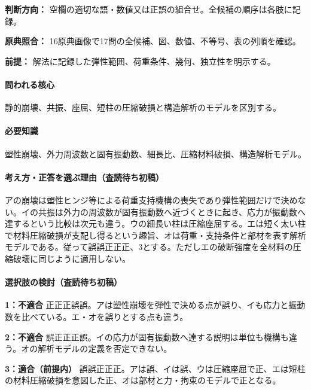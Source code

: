 \noindent\textbf{判断方向：} 空欄の適切な語・数値又は正誤の組合せ。全候補の順序は各肢に記録。\par

\noindent\textbf{原典照合：} 16原典画像で17問の全候補、図、数値、不等号、表の列順を確認。\par

\noindent\textbf{前提：} 解法に記録した弾性範囲、荷重条件、幾何、独立性を明示する。\par

\paragraph{問われる核心} 静的崩壊、共振、座屈、短柱の圧縮破損と構造解析のモデルを区別する。

\paragraph{必要知識} 塑性崩壊、外力周波数と固有振動数、細長比、圧縮材料破損、構造解析モデル。

\paragraph{考え方・正答を選ぶ理由（査読待ち初稿）} アの崩壊は塑性ヒンジ等による荷重支持機構の喪失であり弾性範囲だけで決めない。イの共振は外力の周波数が固有振動数へ近づくときに起き、応力が振動数へ達するという比較は次元も違う。ウの細長い柱は圧縮座屈する。エは短く太い柱で材料圧縮破損が支配し得るという趣旨、オは荷重・支持条件と部材を表す解析モデルである。従って誤誤正正正、3とする。ただしエの破断強度を全材料の圧縮破壊に同じように適用しない。

\paragraph{選択肢の検討（査読待ち初稿）}\mbox{}\par

\noindent\textbf{1：不適合} 正正正誤誤。アは塑性崩壊を弾性で決める点が誤り、イも応力と振動数を比べている。エ・オを誤りとする点も違う。\par

\noindent\textbf{2：不適合} 誤正正正誤。イの応力が固有振動数へ達する説明は単位も機構も違う。オの解析モデルの定義を否定できない。\par

\noindent\textbf{3：適合（前提内）} 誤誤正正正。アは誤、イは誤、ウは圧縮座屈で正、エは短柱の材料圧縮破損を意図した正、オは部材と力・拘束のモデルで正となる。\par

